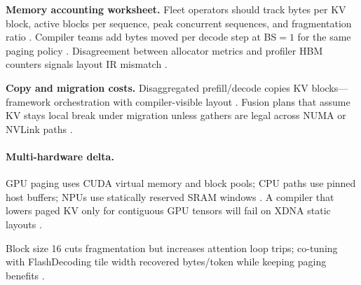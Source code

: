 \textbf{Memory accounting worksheet.} Fleet operators should track bytes per KV block, active blocks per sequence, peak concurrent sequences, and fragmentation ratio \citep{kwon2023vllm,patel2025llminference,memoryfloor2026,dlbook,yirage2026,chen2020compilerbasedhardw,taxbreak2026,liu2024deepseekv3,dao2022flashattention,dao2023flashdecoding,nvidia2024cudagraphs,semianalysis2024tma,amd2024xdna,amd2024aie,nvidia2022hopper,dlbook}. Compiler teams add bytes moved per decode step at BS${=}1$ for the same paging policy \citep{taxbreak2026,memoryfloor2026,yirage2026,chen2020compilerbasedhardw,patel2025llminference,kwon2023vllm,dao2022flashattention,dlbook}. Disagreement between allocator metrics and profiler HBM counters signals layout IR mismatch \citep{memoryfloor2026,yirage2026,chen2020compilerbasedhardw,patel2025llminference,kwon2023vllm,taxbreak2026,dao2023flashdecoding,dlbook}.

\textbf{Copy and migration costs.} Disaggregated prefill/decode copies KV blocks---framework orchestration with compiler-visible layout \citep{patel2025llminference,kwon2023vllm,liu2024deepseekv3,dlbook,yirage2026,chen2020compilerbasedhardw,memoryfloor2026,taxbreak2026,dao2022flashattention,dao2023flashdecoding,nvidia2024cudagraphs,semianalysis2024tma,amd2024xdna,amd2024aie,nvidia2022hopper,dlbook}. Fusion plans that assume KV stays local break under migration unless gathers are legal across NUMA or NVLink paths \citep{patel2025llminference,kwon2023vllm,yirage2026,chen2020compilerbasedhardw,memoryfloor2026,taxbreak2026,liu2024deepseekv3,dlbook}.

\paragraph{Multi-hardware delta.} GPU paging uses CUDA virtual memory and block pools; CPU paths use pinned host buffers; NPUs use statically reserved SRAM windows \citep{dlbook,amd2024aie,amd2024xdna,yirage2026,chen2020compilerbasedhardw,kwon2023vllm,patel2025llminference,taxbreak2026,memoryfloor2026,dao2022flashattention,semianalysis2024tma,nvidia2022hopper,nvidia2024cudagraphs,dao2023flashdecoding}. A compiler that lowers paged KV only for contiguous GPU tensors will fail on XDNA static layouts \citep{amd2024xdna,amd2024aie,chen2020compilerbasedhardw,yirage2026}.

\begin{example}
Block size 16 cuts fragmentation but increases attention loop trips; co-tuning with FlashDecoding tile width recovered bytes/token while keeping paging benefits \citep{kwon2023vllm,dao2023flashdecoding,memoryfloor2026,yirage2026,patel2025llminference,taxbreak2026}.
\end{example}

